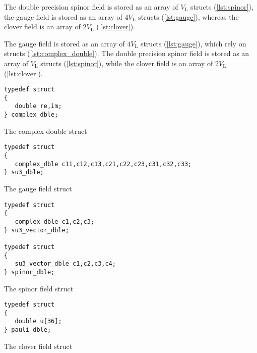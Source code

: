 The double precision spinor field is stored as an array of $V_\mathrm{L}$  structs (\cref{lst:spinor}), the gauge field is stored as an array of $4V_\mathrm{L}$  structs (\cref{lst:gauge}), whereas the clover field is an array of $2V_\mathrm{L}$  (\cref{lst:clover}).

The gauge field is stored as an array of $4V_\mathrm{L}$  structs (\cref{lst:gauge}), which rely on  structs (\cref{lst:complex_double}). The double precision spinor field is stored as an array of $V_\mathrm{L}$  structs (\cref{lst:spinor}), while the clover field is an array of $2V_\mathrm{L}$  (\cref{lst:clover}). 

\begin{codelisting}
\begin{verbatim}
typedef struct
{
   double re,im;
} complex_dble;
\end{verbatim}
\caption{The complex double struct}
\label{lst:complex_double}
\end{codelisting}

\begin{codelisting}
\begin{verbatim}
typedef struct
{
   complex_dble c11,c12,c13,c21,c22,c23,c31,c32,c33;
} su3_dble;
\end{verbatim}
\caption{The gauge field struct}
\label{lst:gauge}
\end{codelisting}



\begin{codelisting}
\begin{verbatim}
typedef struct
{
   complex_dble c1,c2,c3;
} su3_vector_dble;

typedef struct
{
   su3_vector_dble c1,c2,c3,c4;
} spinor_dble;
\end{verbatim}
\caption{The spinor field struct}
\label{lst:spinor}
\end{codelisting}


\begin{codelisting}
\begin{verbatim}
typedef struct
{
   double u[36];
} pauli_dble;
\end{verbatim}
\caption{The clover field struct}
\label{lst:clover}
\end{codelisting}

